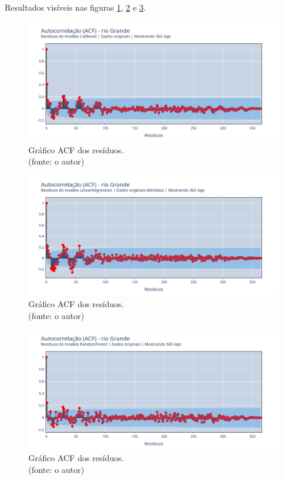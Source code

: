 Resultados visíveis nas figuras \ref{fig:grande_CB_WFV_ORIG_RESID_ACF}, \ref{fig:grande_LR_WFV_ORIG_RESID_ACF} e \ref{fig:grande_RF_WFV_ORIG_RESID_ACF}.

\begin{figure}[!h]
\centering
\includegraphics[scale=0.33]{Figuras/rio_grande/wfv/CB/CB_WFV_ORIG_RESID_ACF.png}
\caption{Gráfico ACF dos resíduos.\\(fonte: o autor)}
\label{fig:grande_CB_WFV_ORIG_RESID_ACF}
\end{figure}

\begin{figure}[!h]
\centering
\includegraphics[scale=0.33]{Figuras/rio_grande/wfv/LR/LR_WFV_ORIG_RESID_ACF.png}
\caption{Gráfico ACF dos resíduos.\\(fonte: o autor)}
\label{fig:grande_LR_WFV_ORIG_RESID_ACF}
\end{figure}

\begin{figure}[!h]
\centering
\includegraphics[scale=0.33]{Figuras/rio_grande/wfv/RF/RF_WFV_ORIG_RESID_ACF.png}
\caption{Gráfico ACF dos resíduos.\\(fonte: o autor)}
\label{fig:grande_RF_WFV_ORIG_RESID_ACF}
\end{figure}
\clearpage

